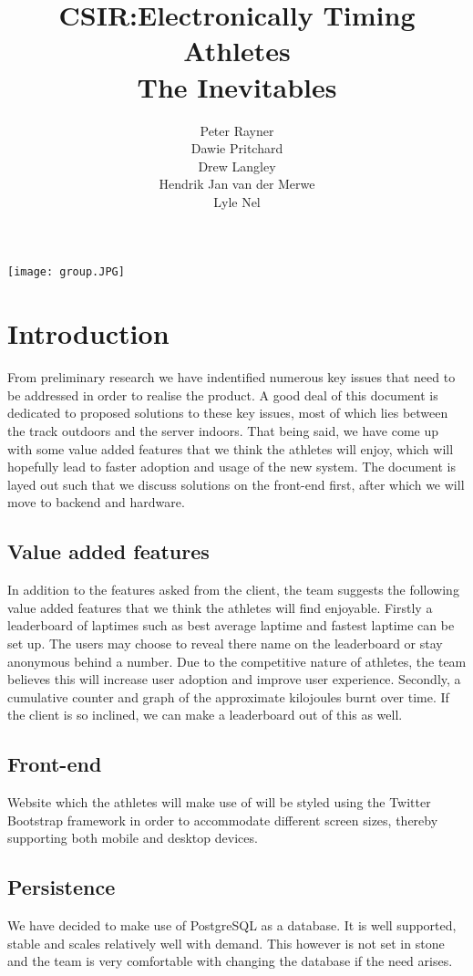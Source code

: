 \documentclass{article}
\title{CSIR:Electronically Timing Athletes\\
The Inevitables
}
\author{  
            Peter Rayner\\
            Dawie Pritchard\\
            Drew Langley\\
            Hendrik Jan van der Merwe\\
            Lyle Nel\\
        }
\begin{document}
\maketitle

\texttt{[image: group.JPG]}

\newpage

\tableofcontents

\newpage


\section{Introduction}
From preliminary research we have indentified numerous key issues that need to be addressed in order to realise the product. A good deal of this document is dedicated to proposed solutions to these key issues, most of which lies between the track outdoors and the server indoors. That being said, we have come up with some value added features that we think the athletes will enjoy, which will hopefully lead to faster adoption and usage of the new system. The document is layed out such that we discuss solutions on the front-end first, after which we will move to backend and hardware.

\subsection{Value added features}
In addition to the features asked from the client, the team suggests the following value added features that we think the athletes will find enjoyable. Firstly a leaderboard of laptimes such as best average laptime and fastest laptime can be set up. The users may choose to reveal there name on the leaderboard or stay anonymous behind a number. Due to the competitive nature of athletes, the team believes this will increase user adoption and improve user experience. Secondly, a cumulative counter and graph of the approximate kilojoules burnt over time. If the client is so inclined, we can make a leaderboard out of this as well.

\subsection{Front-end}
Website which the athletes will make use of will be styled using the Twitter Bootstrap framework in order to accommodate different screen sizes, thereby supporting both mobile and desktop devices.

\subsection{Persistence}
We have decided to make use of PostgreSQL as a database. It is well supported, stable and scales relatively well with demand. This however is not set in stone and the team is very comfortable with changing the database if the need arises.
\end{document}
